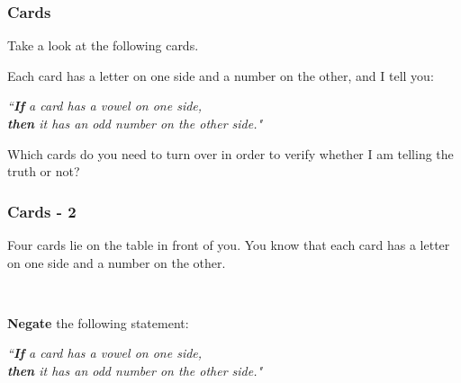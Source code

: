 \documentclass[14pt]{beamer}
\begin{document}
\begin{frame}
\frametitle{Cards}

Take a look at the following cards.

\begin{center}
\end{center}

Each card has a letter on one side and a number on the other, and I tell you:

\medskip
\begin{block}{}
		 \emph{``\textbf{If} a card has a vowel on one side, \\ 
		 \textbf{then} it has an odd number on the other side." }
\end{block}

	
\medskip
Which cards do you need to turn over in order to verify whether I am telling the truth or not?

%
%
%
%
%
%
%
\end{frame}


\begin{frame}
\frametitle{Cards - 2}

Four cards lie on the table in front of you.  You know that each card has a letter on one side and a number on the other.  

\

{\bf Negate} the following statement:
\begin{block}{}
		 \emph{``\textbf{If} a card has a vowel on one side, \\ 
		 \textbf{then} it has an odd number on the other side." }
\end{block}
\end{frame}
\end{document}
